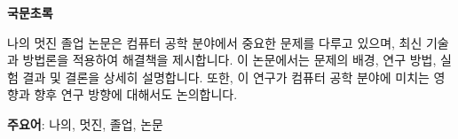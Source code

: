 \vspace*{8pt}

\begin{center}
    {\fontsize{16}{0}\selectfont \textbf{국문초록}}
\end{center}

\vspace*{10pt}

나의 멋진 졸업 논문은 컴퓨터 공학 분야에서 중요한 문제를 다루고 있으며, 최신 기술과 방법론을 적용하여 해결책을 제시합니다. 이 논문에서는 문제의 배경, 연구 방법, 실험 결과 및 결론을 상세히 설명합니다. 또한, 이 연구가 컴퓨터 공학 분야에 미치는 영향과 향후 연구 방향에 대해서도 논의합니다.

\vspace*{10pt}

\quad \textbf{주요어}: 나의, 멋진, 졸업, 논문

\thispagestyle{empty}
\pagebreak
